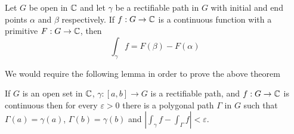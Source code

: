 \begin{theorem}
    Let $G$ be open in $\mathbb{C}$ and let $\gamma$ be a rectifiable path in $G$ with initial and end points $\alpha$ and $\beta$ respectively. If $f: G\to\mathbb{C}$ is a continuous function with a primitive $F: G\to\mathbb{C}$, then 
    \begin{equation*}
        \int_\gamma f = F(\beta) - F(\alpha)
    \end{equation*}
\end{theorem}

We would require the following lemma in order to prove the above theorem 

\begin{lemma}
    If $G$ is an open set in $\mathbb{C}$, $\gamma: [a,b]\to G$ is a rectifiable path, and $f: G\to\mathbb{C}$ is continuous then for every $\varepsilon > 0$ there is a polygonal path $\Gamma$ in $G$ such that $\Gamma(a) = \gamma(a)$, $\Gamma(b) = \gamma(b)$ and $|\int_\gamma f - \int_\Gamma f| < \varepsilon$.
\end{lemma}
